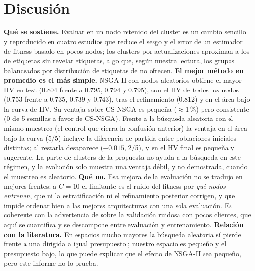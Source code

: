 \documentclass[11pt,a4paper]{article}
\begin{document}
\section{Discusión}
\textbf{Qué se sostiene.} Evaluar en un nodo retenido del cluster es un cambio sencillo y reproducido en cuatro estudios que reduce el sesgo y el error de un estimador de fitness basado en pocos nodos; los clusters por actualizaciones aproximan a los de etiquetas sin revelar etiquetas, algo que, según nuestra lectura, los grupos balanceados por distribución de etiquetas de \cite{yuan2022resourceaware} no ofrecen. \textbf{El mejor método en promedio es el más simple.} NSGA-II con nodos aleatorios obtiene el mayor HV en test (0.804 frente a 0.795, 0.794 y 0.795), con el HV de todos los nodos (0.753 frente a 0.735, 0.739 y 0.743), tras el refinamiento (0.812) y en el área bajo la curva de HV. Su ventaja sobre CS-NSGA es pequeña ($\approx$1\,\%) pero consistente (0 de 5 semillas a favor de CS-NSGA). Frente a la búsqueda aleatoria con el mismo muestreo (el control que cierra la confusión anterior) la ventaja en el área bajo la curva (5/5) incluye la diferencia de partida entre poblaciones iniciales distintas; al restarla desaparece ($-0.015$, 2/5), y en el HV final es pequeña y sugerente. La parte de clusters de la propuesta no ayuda a la búsqueda en este régimen, y la evolución solo muestra una ventaja débil, y no demostrada, cuando el muestreo es aleatorio. \textbf{Qué no.} Esa mejora de la evaluación no se tradujo en mejores frentes: a $C=10$ el limitante es el ruido del fitness por \emph{qué nodos entrenan}, que ni la estratificación ni el refinamiento posterior corrigen, y que impide ordenar bien a las mejores arquitecturas con una sola evaluación. Es coherente con la advertencia de \cite{khodak2021federated} sobre la validación ruidosa con pocos clientes, que aquí se cuantifica y se descompone entre evaluación y entrenamiento. \textbf{Relación con la literatura.} En espacios mucho mayores la búsqueda aleatoria sí pierde frente a una dirigida a igual presupuesto \cite{dudziak2022fedoras}; nuestro espacio es pequeño y el presupuesto bajo, lo que puede explicar que el efecto de NSGA-II sea pequeño, pero este informe no lo prueba.
\end{document}

